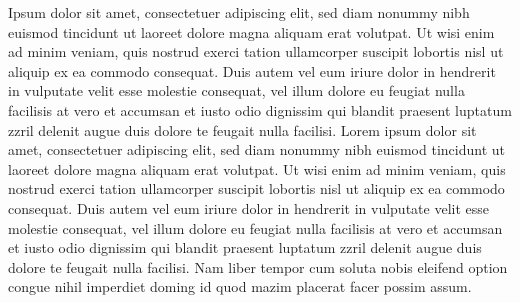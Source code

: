 Ipsum dolor sit amet, consectetuer adipiscing elit, sed diam nonummy nibh euismod tincidunt ut laoreet dolore magna aliquam erat volutpat. Ut wisi enim ad minim veniam, quis nostrud exerci tation ullamcorper suscipit lobortis nisl ut aliquip ex ea commodo consequat. Duis autem vel eum iriure dolor in hendrerit in vulputate velit esse molestie consequat, vel illum dolore eu feugiat nulla facilisis at vero et accumsan et iusto odio dignissim qui blandit praesent luptatum zzril delenit augue duis dolore te feugait nulla facilisi. Lorem ipsum dolor sit amet, consectetuer adipiscing elit, sed diam nonummy nibh euismod tincidunt ut laoreet dolore magna aliquam erat volutpat. Ut wisi enim ad minim veniam, quis nostrud exerci tation ullamcorper suscipit lobortis nisl ut aliquip ex ea commodo consequat. Duis autem vel eum iriure dolor in hendrerit in vulputate velit esse molestie consequat, vel illum dolore eu feugiat nulla facilisis at vero et accumsan et iusto odio dignissim qui blandit praesent luptatum zzril delenit augue duis dolore te feugait nulla facilisi. Nam liber tempor cum soluta nobis eleifend option congue nihil imperdiet doming id quod mazim placerat facer possim assum.

